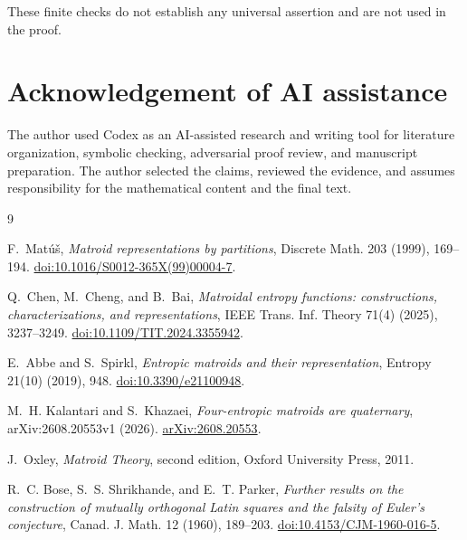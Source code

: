 \documentclass[11pt]{article}
\numberwithin{equation}{section}
\begin{document}
These finite checks do not establish any universal assertion and are not used
in the proof.

\section*{Acknowledgement of AI assistance}


The author used Codex as an AI-assisted research and writing tool for
literature organization, symbolic checking, adversarial proof review, and
manuscript preparation. The author selected the claims, reviewed the evidence,
and assumes responsibility for the mathematical content and the final text.

\begin{thebibliography}{9}
\footnotesize
\raggedright

F.~Mat\'u\v{s},
\emph{Matroid representations by partitions},
Discrete Math. 203 (1999), 169--194.
\href{https://doi.org/10.1016/S0012-365X(99)00004-7}{doi:10.1016/S0012-365X(99)00004-7}.

Q.~Chen, M.~Cheng, and B.~Bai,
\emph{Matroidal entropy functions: constructions, characterizations, and representations},
IEEE Trans. Inf. Theory 71(4) (2025), 3237--3249.
\href{https://doi.org/10.1109/TIT.2024.3355942}{doi:10.1109/TIT.2024.3355942}.

E.~Abbe and S.~Spirkl,
\emph{Entropic matroids and their representation},
Entropy 21(10) (2019), 948.
\href{https://doi.org/10.3390/e21100948}{doi:10.3390/e21100948}.

M.~H. Kalantari and S.~Khazaei,
\emph{Four-entropic matroids are quaternary},
arXiv:2608.20553v1 (2026).
\href{https://arxiv.org/abs/2608.20553}{arXiv:2608.20553}.

J.~Oxley,
\emph{Matroid Theory}, second edition,
Oxford University Press, 2011.

R.~C. Bose, S.~S. Shrikhande, and E.~T. Parker,
\emph{Further results on the construction of mutually orthogonal Latin squares and the falsity of Euler's conjecture},
Canad. J. Math. 12 (1960), 189--203.
\href{https://doi.org/10.4153/CJM-1960-016-5}{doi:10.4153/CJM-1960-016-5}.

\end{thebibliography}
\end{document}
